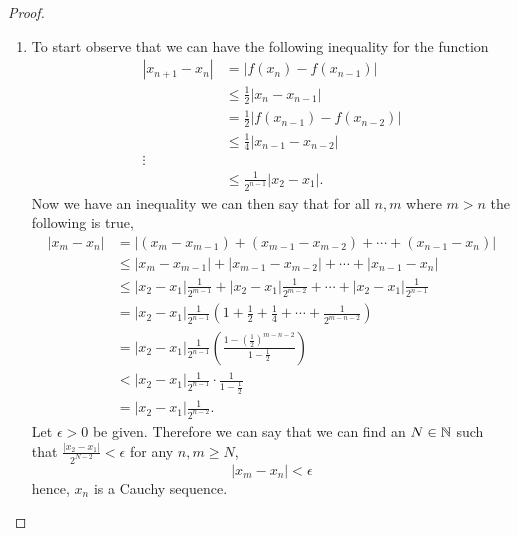 \documentclass[10pt, a4paper]{article}
\begin{document}
\begin{example}
    \begin{proof}
    \begin{enumerate}[label = \alph*.]
        \item 
        To start observe that we can have the following inequality for the function
        \begin{align*}
            |x_{n + 1} - x_n| &= |f(x_{n}) - f(x_{n - 1})| \\
            &\leq \frac{1}{2}|x_{n} - x_{n - 1}| \\
            &= \frac{1}{2}|f(x_{n - 1}) - f(x_{n - 2})| \\
            &\leq \frac{1}{4}|x_{n - 1} - x_{n - 2}| \\
            \vdots \\
            &\leq \frac{1}{2 ^ {n - 1}}|x_2 - x_1|.
        \end{align*}
        Now we have an inequality we can then say that for all $n, m$ where $m > n$ the following is true,
        \begin{align*}
            |x_m - x_n| &= |(x_m - x_{m - 1}) + (x_{m - 1} - x_{m - 2}) + \cdots + (x_{n - 1} - x_{n})| \\
            &\leq |x_m - x_{m - 1}| + |x_{m - 1} - x_{m - 2}| + \cdots + |x_{n - 1} - x_{n}| \\
            &\leq |x_2 - x_1|\frac{1}{2 ^ {m - 1}} + |x_2 - x_1|\frac{1}{2 ^ {m - 2}} + \cdots + |x_2 - x_1|\frac{1}{2 ^ {n - 1}} \\
            &= |x_2 - x_1|\frac{1}{2 ^ {n - 1}}\left(1 + \frac{1}{2} + \frac{1}{4} + \cdots + \frac{1}{2 ^ {m - n - 2}}\right) \\
            &= |x_2 - x_1|\frac{1}{2 ^ {n - 1}}\left(\frac{1 - \left(\frac{1}{2}\right) ^ {m - n - 2}}{1 - \frac{1}{2}}\right) \\
            &< |x_2 - x_1|\frac{1}{2 ^ {n - 1}} \cdot \frac{1}{1 - \frac{1}{2}} \\
            &= |x_2 - x_1|\frac{1}{2 ^ {n - 2}}.
        \end{align*}
        Let $\epsilon > 0$ be given. Therefore we can say that we can find an $N \in \mathbb{N}$ such that $\frac{|x_2 - x_1|}{2 ^ {N - 2}} < \epsilon$ for any $n, m \geq N$,
        \[
        |x_m - x_n| < \epsilon
        \]
        hence, $x_n$ is a Cauchy sequence.
    \end{enumerate}
    \end{proof}
\end{example}
\end{document}
